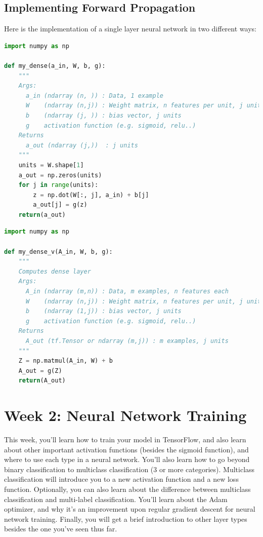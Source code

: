 \documentclass[a4paper, 12pt]{book}
\begin{document}
\subsection{Implementing Forward Propagation}
Here is the implementation of a single layer neural network in two different ways:
\begin{lstlisting}[language=Python, caption={without vectorization}]
import numpy as np

def my_dense(a_in, W, b, g):
    """
    Args:
      a_in (ndarray (n, )) : Data, 1 example 
      W    (ndarray (n,j)) : Weight matrix, n features per unit, j units
      b    (ndarray (j, )) : bias vector, j units  
      g    activation function (e.g. sigmoid, relu..)
    Returns
      a_out (ndarray (j,))  : j units
    """
    units = W.shape[1]
    a_out = np.zeros(units)
    for j in range(units):
        z = np.dot(W[:, j], a_in) + b[j]
        a_out[j] = g(z)   
    return(a_out)
\end{lstlisting}

\begin{lstlisting}[language=Python, caption={with vectorization}]
import numpy as np

def my_dense_v(A_in, W, b, g):
    """
    Computes dense layer
    Args:
      A_in (ndarray (m,n)) : Data, m examples, n features each
      W    (ndarray (n,j)) : Weight matrix, n features per unit, j units
      b    (ndarray (1,j)) : bias vector, j units  
      g    activation function (e.g. sigmoid, relu..)
    Returns
      A_out (tf.Tensor or ndarray (m,j)) : m examples, j units
    """
    Z = np.matmul(A_in, W) + b
    A_out = g(Z)
    return(A_out)
\end{lstlisting}

\section{Week 2: Neural Network Training}
This week, you'll learn how to train your model in TensorFlow, and also learn about other important activation functions (besides the sigmoid function), and where to use each type in a neural network. You'll also learn how to go beyond binary classification to multiclass classification (3 or more categories). Multiclass classification will introduce you to a new activation function and a new loss function. Optionally, you can also learn about the difference between multiclass classification and multi-label classification. You'll learn about the Adam optimizer, and why it's an improvement upon regular gradient descent for neural network training. Finally, you will get a brief introduction to other layer types besides the one you've seen thus far.
\end{document}
